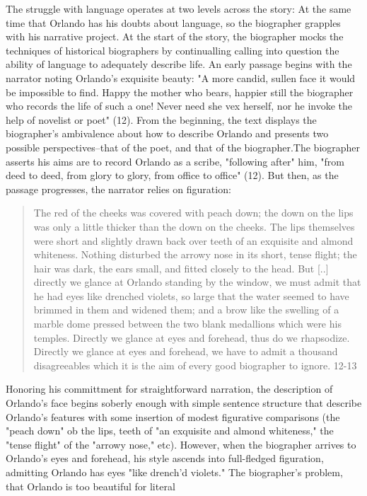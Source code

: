 \documentclass[11pt]{article}
\begin{document}
The struggle with language operates at two levels across the story: At
the same time that Orlando has his doubts about language, so the
biographer grapples with his narrative project. At the start of the
story, the biographer mocks the techniques of historical biographers
by continualling calling into question the ability of language to
adequately describe life. An early passage begins with the narrator
noting Orlando's exquisite beauty: "A more candid, sullen face it
would be impossible to find. Happy the mother who bears, happier still
the biographer who records the life of such a one! Never need she vex
herself, nor he invoke the help of novelist or poet" (12). From the
beginning, the text displays the biographer's ambivalence about how to
describe Orlando and presents two possible perspectives--that of the
poet, and that of the biographer.The biographer asserts his aims are
to record Orlando as a scribe, "following after" him, "from deed to
deed, from glory to glory, from office to office" (12). But then, as the
passage progresses, the narrator relies on figuration:
\begin{quote}
The red of the cheeks was covered with peach down; the down on
the lips was only a little thicker than the down on the cheeks. The
lips themselves were short and slightly drawn back over teeth of an
exquisite and almond whiteness. Nothing disturbed the arrowy nose in
its short, tense flight; the hair was dark, the ears small, and fitted
closely to the head. But [..] directly we glance at Orlando standing
by the window, we must admit that he had eyes like drenched violets,
so large that the water seemed to have brimmed in them and widened
them; and a brow like the swelling of a marble dome pressed between
the two blank medallions which were his temples. Directly we glance at
eyes and forehead, thus do we rhapsodize. Directly we glance at eyes
and forehead, we have to admit a thousand disagreeables which it is
the aim of every good biographer to ignore. 12-13
\end{quote}
Honoring his committment for straightforward narration, the
description of Orlando's face begins soberly enough with simple
sentence structure that describe Orlando's features with some
insertion of modest figurative comparisons (the "peach down" ob the
lips, teeth of "an exquisite and almond whiteness," the "tense flight"
of the "arrowy nose," etc). However, when the biographer arrives to
Orlando's eyes and forehead, his style ascends into full-fledged
figuration, admitting Orlando has eyes "like drench'd violets." The
biographer's problem, that Orlando is too beautiful for literal
\end{document}
